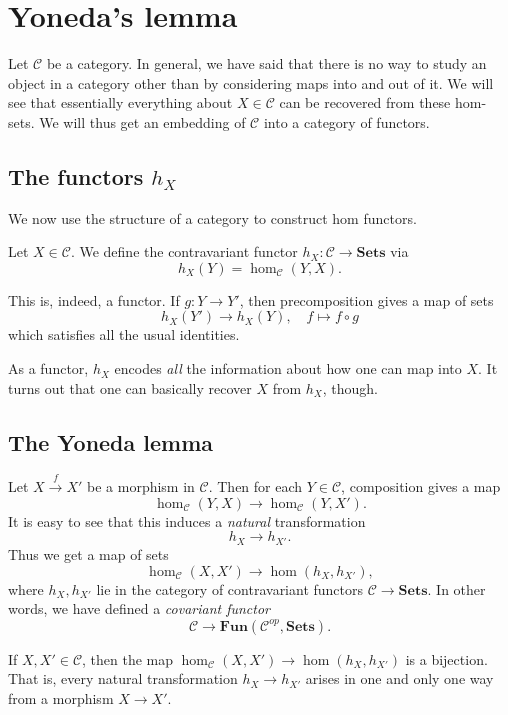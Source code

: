 \section{Yoneda's lemma}


Let $\mathcal{C}$ be a category.
In general, we have said that there is no way to study an object in  a
category other than by considering maps into and out of it.
We will see that essentially everything about $X \in \mathcal{C}$ can be
recovered from these hom-sets.
We will thus get an embedding of $\mathcal{C}$ into a category of functors.

\subsection{The functors $h_X$}

We now use the structure of a category to construct hom functors.
\begin{definition}
Let $X \in \mathcal{C}$. We define the contravariant functor $h_X: \mathcal{C}
\to \mathbf{Sets}$ via
\[ h_X(Y) = \hom_{\mathcal{C}}(Y, X).  \]
\end{definition}

This is, indeed, a functor. If $g: Y \to Y'$, then precomposition gives a map
of sets
\[ h_X(Y') \to h_X(Y),  \quad f \mapsto f \circ g \]
which satisfies all the usual identities.

As a functor, $h_X$ encodes \emph{all} the information about
how one can map into $X$.
It turns out that one can basically recover $X$ from $h_X$, though.

\subsection{The Yoneda lemma}

Let $X \stackrel{f}{\to} X'$ be a morphism in $\mathcal{C}$.
Then for each $Y \in \mathcal{C}$, composition gives a map
\[ \hom_{\mathcal{C}}(Y, X) \to \hom_{\mathcal{C}}(Y, X').  \]
It is easy to see that this induces a \emph{natural} transformation
\[ h_{X} \to h_{X'}.  \]
Thus we get a map of sets
\[ \hom_{\mathcal{C}}(X, X') \to \hom(h_X, h_{X'}),  \]
where $h_X, h_{X'}$ lie in the category of contravariant functors $\mathcal{C}
\to \mathbf{Sets}$.
In other words, we have defined a \emph{covariant functor}
\[ \mathcal{C} \to \mathbf{Fun}(\mathcal{C}^{op}, \mathbf{Sets}).  \]

\begin{theorem} If $X, X' \in \mathcal{C}$, then the map
$\hom_{\mathcal{C}}(X, X') \to \hom(h_X, h_{X'})$ is a bijection. That is,
every natural transformation $h_X \to h_{X'}$ arises in one and only one way
from a morphism $X \to X'$.
\end{theorem}


